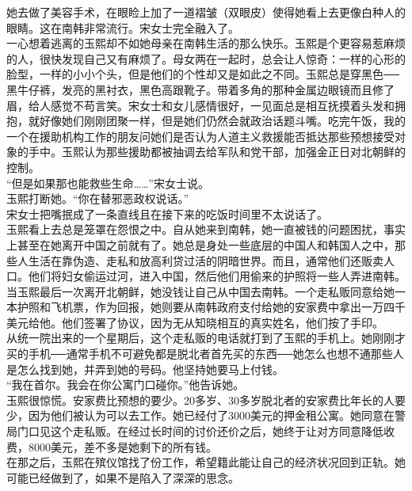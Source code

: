 她去做了美容手术，在眼睑上加了一道褶皱（双眼皮）使得她看上去更像白种人的眼睛。这在南韩非常流行。宋女士完全融入了。\\

一心想着逃离的玉熙却不如她母亲在南韩生活的那么快乐。玉熙是个更容易惹麻烦的人，很快发现自己又有麻烦了。母女两在一起时，总会让人惊奇：一样的心形的脸型，一样的小小个头，但是他们的个性却又是如此之不同。玉熙总是穿黑色──黑牛仔裤，发亮的黑衬衣，黑色高跟靴子。带着多角的那种金属边眼镜而且修了眉，给人感觉不苟言笑。宋女士和女儿感情很好，一见面总是相互抚摸着头发和拥抱，就好像她们刚刚团聚一样，但是她们仍然会就政治话题斗嘴。吃完午饭，我的一个在援助机构工作的朋友问她们是否认为人道主义救援能否抵达那些预想接受对象的手中。玉熙认为那些援助都被抽调去给军队和党干部，加强金正日对北朝鲜的控制。\\

“但是如果那也能救些生命……”宋女士说。\\

玉熙打断她。“你在替邪恶政权说话。”\\

宋女士把嘴抿成了一条直线且在接下来的吃饭时间里不太说话了。\\

玉熙看上去总是笼罩在怨恨之中。自从她来到南韩，她一直被钱的问题困扰，事实上甚至在她离开中国之前就有了。她总是身处一些底层的中国人和韩国人之中，那些人生活在靠伪造、走私和放高利贷过活的阴暗世界。而且，通常他们还贩卖人口。他们将妇女偷运过河，进入中国，然后他们用偷来的护照将一些人弄进南韩。当玉熙最后一次离开北朝鲜，她没钱让自己从中国去南韩。一个走私贩同意给她一本护照和飞机票，作为回报，她则要从南韩政府支付给她的安家费中拿出一万四千美元给他。他们签署了协议，因为无从知晓相互的真实姓名，他们按了手印。\\

从统一院出来的一个星期后，这个走私贩的电话就打到了玉熙的手机上。她刚刚才买的手机──通常手机不可避免都是脱北者首先买的东西──她怎么也想不通那些人是怎么找到她，并弄到她的号码。他坚持她要马上付钱。\\

“我在首尔。我会在你公寓门口碰你。”他告诉她。\\

玉熙很惊慌。安家费比预想的要少。20多岁、30多岁脱北者的安家费比年长的人要少，因为他们被认为可以去工作。她已经付了3000美元的押金租公寓。她同意在警局门口见这个走私贩。在经过长时间的讨价还价之后，她终于让对方同意降低收费，8000美元，差不多是她剩下的所有钱。\\

在那之后，玉熙在殡仪馆找了份工作，希望籍此能让自己的经济状况回到正轨。她可能已经做到了，如果不是陷入了深深的思念。\\

